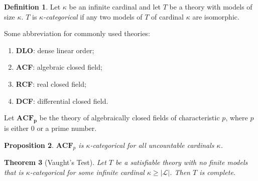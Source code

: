 \documentclass{amsart}
\newtheorem{theorem}{Theorem}[subsection]
\newtheorem{lemma}[theorem]{Lemma}
\newtheorem{proposition}[theorem]{Proposition}
\theoremstyle{definition}
\newtheorem{definition}[theorem]{Definition}
\numberwithin{equation}{section}
\begin{document}

\begin{definition}
  Let $\kappa$ be an infinite cardinal and let $T$ be a theory with models of size $\kappa$.
  $T$ is \emph{$\kappa$-categorical} if any two models of $T$ of cardinal $\kappa$ are isomorphic.
\end{definition}

\begin{tcolorbox}
  Some abbreviation for commonly used theories:
  \begin{enumerate}[label = {}]
    \item \textbf{DLO}: dense linear order;
    \item \textbf{ACF}: algebraic closed field;
    \item \textbf{RCF}: real closed field;
    \item \textbf{DCF}: differential closed field.
  \end{enumerate}
\end{tcolorbox}

Let $\mathbf{ACF_p}$ be the theory of algebraically closed fields of characteristic $p$,
where $p$ is either $0$ or a prime number.

\begin{proposition}
  $\mathbf{ACF}_p$ is $\kappa$-categorical for all uncountable cardinals $\kappa$.
\end{proposition}

\begin{theorem}[Vaught's Test]
  Let $T$ be a satisfiable theory with no finite models that is
  $\kappa$-categorical for some infinite cardinal $\kappa \ge |\mathcal{L}|$.
  Then $T$ is complete.
\end{theorem}


\end{document}
